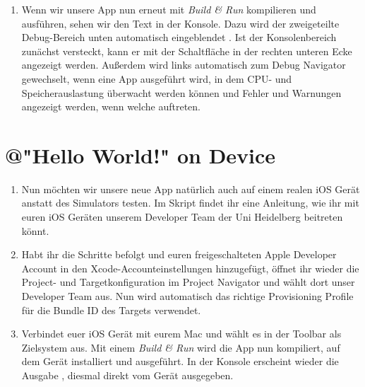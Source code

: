 \documentclass[parskip=half, final]{scrreprt}
\begin{document}
\begin{lecture}
\begin{enumerate}
\item Wenn wir unsere App nun erneut mit \emph{Build \& Run} kompilieren und ausführen, sehen wir den Text  in der Konsole. Dazu wird der zweigeteilte Debug-Bereich unten automatisch eingeblendet . Ist der Konsolenbereich zunächst versteckt, kann er mit der Schaltfläche in der rechten unteren Ecke angezeigt werden. Außerdem wird links automatisch zum Debug Navigator gewechselt, wenn eine App ausgeführt wird, in dem CPU- und Speicherauslastung überwacht werden können und Fehler und Warnungen angezeigt werden, wenn welche auftreten.


\end{enumerate}


\section{@"Hello World!"{} on Device}

\begin{enumerate}

\item Nun möchten wir unsere neue App natürlich auch auf einem realen iOS Gerät anstatt des Simulators testen. Im Skript findet ihr eine Anleitung, wie ihr mit euren iOS Geräten unserem Developer Team der Uni Heidelberg beitreten könnt.

\item Habt ihr die Schritte befolgt und euren freigeschalteten Apple Developer Account in den Xcode-Accounteinstellungen hinzugefügt, öffnet ihr wieder die Project- und Targetkonfiguration im Project Navigator und wählt dort unser Developer Team  aus. Nun wird automatisch das richtige Provisioning Profile für die Bundle ID des Targets verwendet.


\item Verbindet euer iOS Gerät mit eurem Mac und wählt es in der Toolbar als Zielsystem aus. Mit einem \emph{Build \& Run} wird die App nun kompiliert, auf dem Gerät installiert und ausgeführt. In der Konsole erscheint wieder die Ausgabe , diesmal direkt vom Gerät ausgegeben.


\end{enumerate}
\end{lecture}
\end{document}
